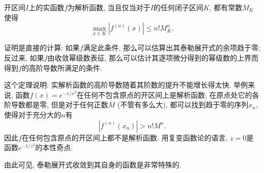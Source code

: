 \begin{theorem}{}
开区间$I$上的实函数$f$为解析函数, 当且仅当对于$I$的任何闭子区间$K$, 都有常数$M_K$使得
$$
\max_{x\in K}|f^{(n)}(x)|\leq n!M_K^n.
$$
\end{theorem}

证明是直接的计算: 如果$f$满足此条件, 那么可以估算出其泰勒展开式的余项趋于零; 反过来, 如果$f$由收敛幂级数表征, 那么可以估计其逐项微分得到的幂级数的上界而得到$f$的高阶导数所满足的条件.

这个定理说明: 实解析函数的高阶导数随着其阶数的提升不能增长得太快. 举例来说, 函数$f(x)=e^{-1/x^2}$在任何不包含原点的开区间上是解析函数; 在原点处它的各阶导数都是零, 但是对于任何正数$M$ (不管有多么大), 都可以找到趋于零的序列$x_n$, 使得对于充分大的$n$有
$$
|f^{(n)}(x_n)|>n!M^n.
$$
因此$f$在任何包含原点的开区间上都不是解析函数. 用复变函数论的语言, $z=0$是函数$e^{-1/z^2}$的本性奇点.

由此可见, 泰勒展开式收敛到其自身的函数是非常特殊的.
